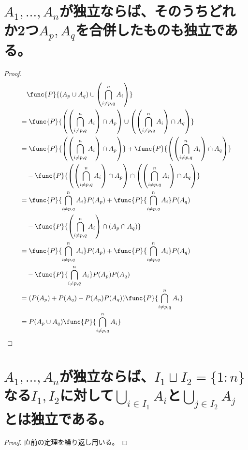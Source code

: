     \section{\texorpdfstring{$A_1,\dotsc,A_n$}{A\_1,...,A\_n}が独立ならば、そのうちどれか2つ\texorpdfstring{$A_p,A_q$}{A\_p, A\_q}を合併したものも独立である。}
        \begin{proof}
            \quad\par
            \begin{align*}
                &\quad \func{P}{(A_p\cup A_q)\cup\left(\bigcap_{i\neq p,q}^n A_i\right)} \\
                &= \func{P}{\left(\left(\bigcap_{i\neq p,q}^n A_i\right)\cap A_p\right)\cup\left(\left(\bigcap_{i\neq p,q}^n A_i\right)\cap A_q\right)} \\
                &= \func{P}{\left(\left(\bigcap_{i\neq p,q}^n A_i\right)\cap A_p\right)} + \func{P}{\left(\left(\bigcap_{i\neq p,q}^n A_i\right)\cap A_q\right)} \\
                &\quad - \func{P}{\left(\left(\bigcap_{i\neq p,q}^n A_i\right)\cap A_p\right)\cap\left(\left(\bigcap_{i\neq p,q}^n A_i\right)\cap A_q\right)} \\
                &= \func{P}{\bigcap_{i\neq p,q}^n A_i}P(A_p) + \func{P}{\bigcap_{i\neq p,q}^n A_i}P(A_q) \\
                &\quad - \func{P}{\left(\bigcap_{i\neq p,q}^n A_i\right)\cap(A_p\cap A_q)} \\
                &= \func{P}{\bigcap_{i\neq p,q}^n A_i}P(A_p) + \func{P}{\bigcap_{i\neq p,q}^n A_i}P(A_q) \\
                &\quad - \func{P}{\bigcap_{i\neq p,q}^n A_i}P(A_p)P(A_q) \\
                &= (P(A_p) + P(A_q) - P(A_p)P(A_q))\func{P}{\bigcap_{i\neq p,q}^n A_i} \\
                &= P(A_p\cup A_q)\func{P}{\bigcap_{i\neq p,q}^n A_i}
            \end{align*}
        \end{proof}
    \section{\texorpdfstring{$A_1,\dotsc,A_n$}{A\_1,...,A\_n}が独立ならば、\texorpdfstring{$I_1\sqcup I_2 = \{1:n\}$}{I\_1 ⊔ I\_2}なる\texorpdfstring{$I_1,I_2$}{I\_1, I\_2}に対して\texorpdfstring{$\bigcup_{i\in I_1}A_i$}{∪\_\{i∈I\_1\}A\_i}と\texorpdfstring{$\bigcup_{j\in I_2}A_j$}{∪\_\{j∈I\_2\}A\_j}とは独立である。}
        \begin{proof}
            直前の定理を繰り返し用いる。
        \end{proof}